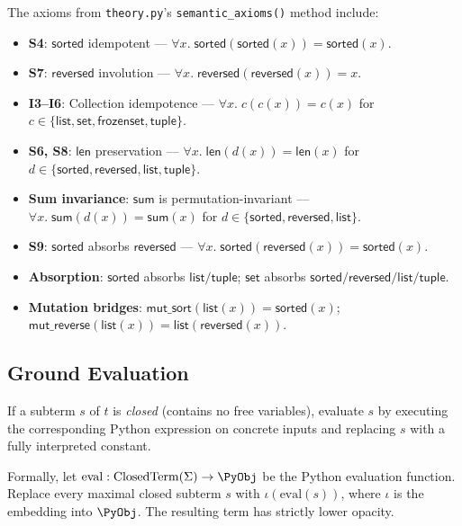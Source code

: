 The axioms from \texttt{theory.py}'s \texttt{semantic\_axioms()}
method include:
\begin{itemize}
  \item \textbf{S4}: $\mathsf{sorted}$ idempotent —
    $\forall x.\;\mathsf{sorted}(\mathsf{sorted}(x)) = \mathsf{sorted}(x)$.
  \item \textbf{S7}: $\mathsf{reversed}$ involution —
    $\forall x.\;\mathsf{reversed}(\mathsf{reversed}(x)) = x$.
  \item \textbf{I3--I6}: Collection idempotence —
    $\forall x.\; c(c(x)) = c(x)$ for $c \in
    \{\mathsf{list}, \mathsf{set}, \mathsf{frozenset}, \mathsf{tuple}\}$.
  \item \textbf{S6, S8}: $\mathsf{len}$ preservation —
    $\forall x.\;\mathsf{len}(d(x)) = \mathsf{len}(x)$ for
    $d \in \{\mathsf{sorted}, \mathsf{reversed}, \mathsf{list},
    \mathsf{tuple}\}$.
  \item \textbf{Sum invariance}: $\mathsf{sum}$ is
    permutation-invariant —
    $\forall x.\;\mathsf{sum}(d(x)) = \mathsf{sum}(x)$ for
    $d \in \{\mathsf{sorted}, \mathsf{reversed}, \mathsf{list}\}$.
  \item \textbf{S9}: $\mathsf{sorted}$ absorbs $\mathsf{reversed}$ —
    $\forall x.\;\mathsf{sorted}(\mathsf{reversed}(x))
    = \mathsf{sorted}(x)$.
  \item \textbf{Absorption}: $\mathsf{sorted}$ absorbs
    $\mathsf{list}/\mathsf{tuple}$; $\mathsf{set}$ absorbs
    $\mathsf{sorted}/\mathsf{reversed}/\mathsf{list}/\mathsf{tuple}$.
  \item \textbf{Mutation bridges}: $\mathsf{mut\_sort}(\mathsf{list}(x))
    = \mathsf{sorted}(x)$;
    $\mathsf{mut\_reverse}(\mathsf{list}(x))
    = \mathsf{list}(\mathsf{reversed}(x))$.
\end{itemize}

\subsection{Ground Evaluation}

\begin{definition}
\label{def:ground-eval}
If a subterm $s$ of $t$ is \emph{closed} (contains no free
variables), evaluate $s$ by executing the corresponding Python
expression on concrete inputs and replacing $s$ with a fully
interpreted constant.

Formally, let $\mathrm{eval} : \mathrm{ClosedTerm}(\Sigma) \to
\PyObj$ be the Python evaluation function.  Replace every maximal
closed subterm $s$ with
$\iota(\mathrm{eval}(s))$, where $\iota$ is the embedding into
$\PyObj$.  The resulting term has strictly lower opacity.
\end{definition}

